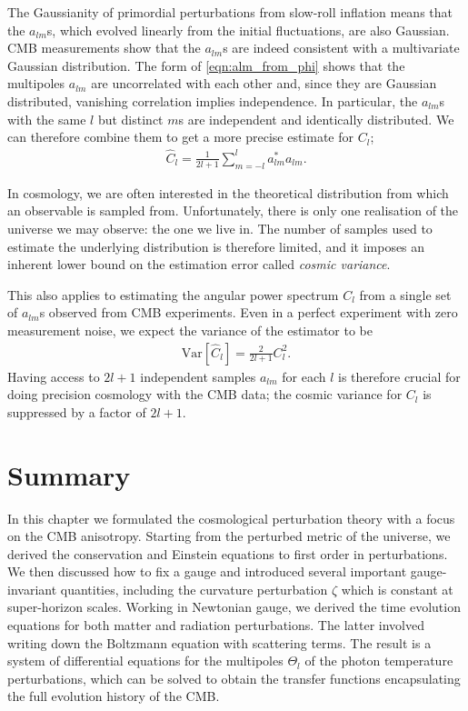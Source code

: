 The Gaussianity of primordial perturbations from slow-roll inflation means that the $a_{lm}$s, which evolved linearly from the initial fluctuations, are also Gaussian. CMB measurements show that the $a_{lm}$s are indeed consistent with a multivariate Gaussian distribution. The form of \eqref{eqn:alm_from_phi} shows that the multipoles $a_{lm}$ are uncorrelated with each other and, since they are Gaussian distributed, vanishing correlation implies independence. In particular, the $a_{lm}$s with the same $l$ but distinct $m$s are independent and identically distributed. We can therefore combine them to get a more precise estimate for $C_l$;
\begin{align}
	\hat{C}_l = \frac{1}{2l+1} \sum_{m=-l}^{l} a^*_{lm} a_{lm}.
\end{align}

In cosmology, we are often interested in the theoretical distribution from which an observable is sampled from. Unfortunately, there is only one realisation of the universe we may observe: the one we live in. The number of samples used to estimate the underlying distribution is therefore limited, and it imposes an inherent lower bound on the estimation error called \textit{cosmic variance}.

This also applies to estimating the angular power spectrum $C_l$ from a single set of $a_{lm}$s observed from CMB experiments. Even in a perfect experiment with zero measurement noise, we expect the variance of the estimator to be
\begin{align}
	\text{Var}\left[ \hat{C}_l \right] = \frac{2}{2l+1} C_l^2.
\end{align}
Having access to $2l+1$ independent samples $a_{lm}$ for each $l$ is therefore crucial for doing precision cosmology with the CMB data; the cosmic variance for $C_l$ is suppressed by a factor of $2l+1$.

\newpage
\section*{Summary}

In this chapter we formulated the cosmological perturbation theory with a focus on the CMB anisotropy. Starting from the perturbed metric of the universe, we derived the conservation and Einstein equations to first order in perturbations. We then discussed how to fix a gauge and introduced several important gauge-invariant quantities, including the curvature perturbation $\zeta$ which is constant at super-horizon scales. Working in Newtonian gauge, we derived the time evolution equations for both matter and radiation perturbations. The latter involved writing down the Boltzmann equation with scattering terms. The result is a system of differential equations for the multipoles $\Theta_l$ of the photon temperature perturbations, which can be solved to obtain the transfer functions encapsulating the full evolution history of the CMB.

